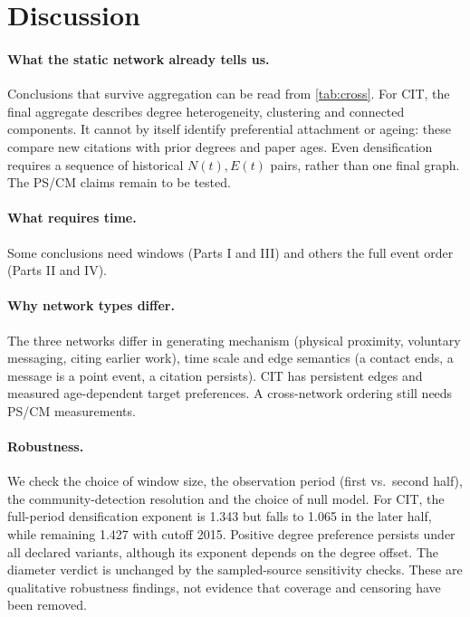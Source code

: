 \section{Discussion}
\label{sec:discussion}

\paragraph{What the static network already tells us.}
Conclusions that survive aggregation can be read from \cref{tab:cross}.
For CIT, the final aggregate describes degree heterogeneity, clustering and
connected components. It cannot by itself identify preferential attachment or
ageing: these compare new citations with prior degrees and paper ages.
Even densification requires a sequence of historical $N(t),E(t)$ pairs, rather
than one final graph. The PS/CM claims remain to be tested.

\paragraph{What requires time.}
Some conclusions need windows (Parts I and III) and others the full event order
(Parts II and IV).

\paragraph{Why network types differ.}
The three networks differ in generating mechanism (physical proximity, voluntary
messaging, citing earlier work), time scale and edge semantics (a contact ends, a
message is a point event, a citation persists).
CIT has persistent edges and measured age-dependent target preferences.
A cross-network ordering still needs PS/CM measurements.

\paragraph{Robustness.}
We check the choice of window size, the observation period (first vs.\ second
half), the community-detection resolution and the choice of null model.
For CIT, the full-period densification exponent is 1.343 but falls to 1.065 in
the later half, while remaining 1.427 with cutoff 2015. Positive degree preference
persists under all declared variants, although its exponent depends on the degree
offset. The diameter verdict is unchanged by the sampled-source sensitivity
checks. These are qualitative robustness findings, not evidence that coverage
and censoring have been removed.


